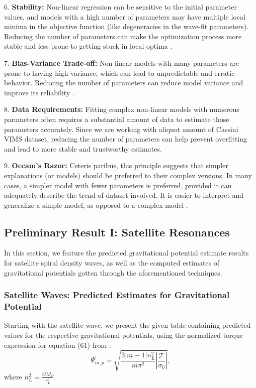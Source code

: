 \documentclass{article}
\begin{document}
6. \textbf{Stability:} Non-linear regression can be sensitive to the initial parameter values, and models with a high number of parameters may have multiple local minima in the objective function (like degeneracies in the wave-fit parameters). Reducing the number of parameters can make the optimization process more stable and less prone to getting stuck in local optima \cite{nocedal2006numerical}.

7. \textbf{Bias-Variance Trade-off:} Non-linear models with many parameters are prone to having high variance, which can lead to unpredictable and erratic behavior. Reducing the number of parameters can reduce model variance and improve its reliability \cite{hastie2009elements}.

8. \textbf{Data Requirements:} Fitting complex non-linear models with numerous parameters often requires a substantial amount of data to estimate those parameters accurately. Since we are working with aliquot amount of Cassini VIMS dataset, reducing the number of parameters can help prevent overfitting and lead to more stable and trustworthy estimates.

9. \textbf{Occam's Razor:} Ceteris paribus, this principle suggests that simpler explanations (or models) should be preferred to their complex versions. In many cases, a simpler model with fewer parameters is preferred, provided it can adequately describe the trend of dataset involved. It is easier to interpret and generalize a simple model, as opposed to a complex model \cite{Sober2015-SOBORA}.





\subsection{Preliminary Result I: Satellite Resonances}
In this section, we feature the predicted gravitational potential estimate results for satellite spiral density waves, as well as the computed estimates of gravitational potentials gotten through the aforementioned techniques. 

\subsubsection{Satellite Waves: Predicted Estimates for Gravitational Potential}
Starting with the satellite wave, we present the given table containing predicted values for the respective gravitational potentials, using the normalized torque expression for equation (61) from \cite{Hedman_2022}:
\begin{equation}
    \Psi_{m,p}^{'} = \sqrt{\frac{3|m - 1|n_{L}^{2}}{m\pi^{2}} \left|\frac{\mathcal{T}}{\sigma_{0}}\right|},
\end{equation}
where $n_{L}^{2} = \frac{G M_{P}}{r_{L}^{3}}$.
\end{document}
